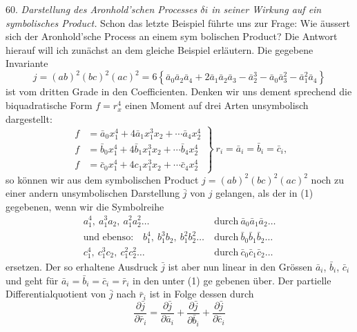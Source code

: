 60. \textit{Darstellung des Aronhold'schen Processes $\delta i$ in seiner Wirkung
auf ein symbolisches Product.} Schon das letzte Beispiel führte uns zur
Frage: Wie äussert sich der Aronhold'sche Process an einem sym\-
bolischen Product? Die Antwort hierauf will ich zunächst an dem
gleiche Beispiel erläutern. Die gegebene Invariante
\[
j = (ab)^2(bc)^2(ac)^2 = 6\left\{\bar a_0\bar a_2\bar a_4+2\bar a_1\bar a_2\bar a_3-\bar a_2^3-\bar a_0\bar a_3^2-\bar a_1^2\bar a_4\right\} \tag{1}
\]
ist vom dritten Grade in den Coefficienten. Denken wir uns dement\-
sprechend die biquadratische Form $f=r_x^4$ einen Moment auf drei Arten
unsymbolisch dargestellt:
\[
\left.
\begin{aligned}
f &= \bar a_0 x_1^4+4\bar a_1 x_1^3x_2+\cdots \bar a_4 x_2^4\\
f &= \bar b_0 x_1^4+4\bar b_1 x_1^3x_2+\cdots \bar b_4 x_2^4\\
f &= \bar c_0 x_1^4+4c_1 x_1^3x_2+\cdots \bar c_4 x_2^4
\end{aligned}
\right\}\ r_i = \bar a_i = \bar b_i = \bar c_i,
\]
so können wir aus dem symbolischen Product $j=(ab)^2(bc)^2(ac)^2$ noch
zu einer andern unsymbolischen Darstellung $\bar j$ von $j$ gelangen, als der
in (1) gegebenen, wenn wir die Symbolreihe
\[
\begin{aligned}
a_1^4,\ a_1^3a_2,\ a_1^2a_2^2\ldots &\ \text{durch}\ \bar a_0\bar a_1\bar a_2\ldots\\
\text{und ebenso:}\quad b_1^4,\ b_1^3b_2,\ b_1^2b_2^2\ldots &\ \text{durch}\ \bar b_0\bar b_1\bar b_2\ldots\\
c_1^4,\ c_1^3c_2,\ c_1^2c_2^2\ldots &\ \text{durch}\ \bar c_0\bar c_1\bar c_2\ldots
\end{aligned}
\]
ersetzen. Der so erhaltene Ausdruck $\bar j$ ist aber nun linear in den
Grössen $\bar a_i$, $\bar b_i$, $\bar c_i$ und geht für $\bar a_i=\bar b_i=\bar c_i=\bar r_i$ in den unter (1) ge\-
gebenen über. Der partielle Differentialquotient von $\bar j$ nach $\bar r_i$ ist in
Folge dessen durch
\[
\frac{\partial\bar j}{\partial\bar r_i} = \frac{\partial\bar j}{\partial\bar a_i} + \frac{\partial\bar j}{\partial\bar b_i} + \frac{\partial\bar j}{\partial\bar c_i} \tag{2}
\]


